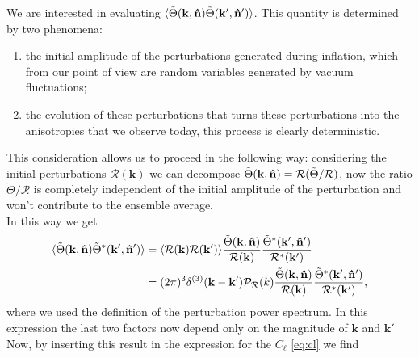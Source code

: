 We are interested in evaluating $\langle\tilde\Theta(\mathbf{k},\mathbf{\hat{n}})\tilde\Theta(\mathbf{k}',\mathbf{\hat{n}}')\rangle$. This quantity is determined by two phenomena:
\begin{enumerate}
    \item the initial amplitude of the perturbations generated during inflation, which from our point of view are random variables generated by vacuum fluctuations;
    \item the evolution of these perturbations that turns these perturbations into the anisotropies that we observe today, this process is clearly deterministic. 
\end{enumerate}
This consideration allows us to proceed in the following way: considering the initial perturbations $\mathcal{R}(\mathbf{k})$ we can decompose $ \tilde\Theta(\mathbf{k},\mathbf{\hat{n}})=\mathcal{R} (\tilde\Theta/\mathcal{R}) $, now the ratio $\tilde\Theta/\mathcal{R}$ is completely independent of the initial amplitude of the perturbation and won't contribute to the ensemble average.\\
In this way we get
\begin{align*}
    \langle\tilde\Theta(\mathbf{k},\mathbf{\hat{n}})\tilde\Theta^*(\mathbf{k}',\mathbf{\hat{n}}')\rangle &= \langle\mathcal{R}(\mathbf{k})\mathcal{R}(\mathbf{k}')\rangle\frac{\tilde\Theta(\mathbf{k},\mathbf{\hat{n}})}{\mathcal{R}(\mathbf{k})}\frac{\tilde\Theta^*(\mathbf{k}',\mathbf{\hat{n}}')}{\mathcal{R}^*(\mathbf{k}')}\\
    &= (2\pi)^3\delta^{(3)}(\mathbf{k}-\mathbf{k}')\mathcal P_{\mathcal{R}}(k)\frac{\tilde\Theta(\mathbf{k},\mathbf{\hat{n}})}{\mathcal{R}(\mathbf{k})}\frac{\tilde\Theta^*(\mathbf{k}',\mathbf{\hat{n}}')}{\mathcal{R}^*(\mathbf{k}')},
\end{align*}
where we used the definition of the perturbation power spectrum. In this expression the last two factors now depend only on the magnitude of $\mathbf k$ and $\mathbf k'$\\Now, by inserting this result in the expression for the $C_\ell$ \eqref{eq:cl} we find 
